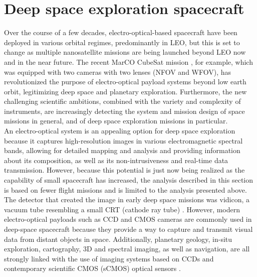 \documentclass[final,5p,times,twocolumn]{elsarticle}
\begin{document}
\section{Deep space exploration spacecraft}
Over the course of a few decades, electro-optical-based spacecraft have been deployed in various orbital regimes, predominantly in LEO, but this is set to change as multiple nanosatellite missions are being launched beyond LEO now and in the near future. The recent MarCO CubeSat mission \citep{schoolcraft2017marco}, for example, which was equipped with two cameras with two lenses (NFOV and WFOV), has revolutionized the purpose of electro-optical payload systems beyond low earth orbit, legitimizing deep space and planetary exploration.   Furthermore, the new challenging scientific ambitions, combined with the variety and complexity of instruments, are increasingly detecting the system and mission design of space missions in general, and of deep space exploration missions in particular. \\
An electro-optical system is an appealing option for deep space exploration because it captures high-resolution images in various electromagnetic spectral bands, allowing for detailed mapping and analysis and providing information about its composition, as well as its non-intrusiveness and real-time data transmission. However, because this potential is just now being realized as the capability of small spacecraft has increased, the analysis described in this section is based on fewer flight missions and is limited to the analysis presented above.\\
The detector that created the image in early deep space missions was vidicon, a vacuum tube resembling a small CRT (cathode ray tube) \citep{nas2023}. However, modern electro-optical payloads such as CCD and CMOS cameras are commonly used in deep-space spacecraft because they provide a way to capture and transmit visual data from distant objects in space. Additionally, planetary geology, in-situ exploration, cartography, 3D and spectral imaging, as well as navigation, are all strongly linked with the use of imaging systems based on CCDs and contemporary scientific CMOS (sCMOS) optical sensors \citep{Behnke2015IMAGINGSF}.
\end{document}

